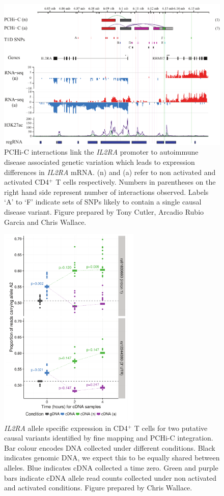 \documentclass[a4paper,11pt]{report}
\begin{document}
\begin{figure}[h]
\centering
\includegraphics[width=\textwidth]{il2ra_ase_region.pdf}
\caption{PCHi-C interactions link the \textit{IL2RA} promoter to autoimmune disease associated genetic variation which leads to expression differences in \textit{IL2RA} mRNA. (n) and (a) refer to non activated and activated CD4$^+$ T cells respectively. Numbers in parentheses on the right hand side represent number of interactions observed. Labels `A' to `F' indicate sets of SNPs likely to contain a single causal disease variant.  Figure prepared by Tony Cutler, Arcadio Rubio Garcia and Chris Wallace.}
\label{fig:il2ra_ase_reg}
\end{figure}

\begin{figure}[h]
\centering
\includegraphics[width=0.6\textwidth]{il2ra_ase_tc.pdf}
\caption{\textit{IL2RA} allele specific expression in CD4$^{+}$ T cells for two putative causal variants identified by fine mapping and PCHi-C integration. Bar colour encodes DNA collected under different conditions. Black indicates genomic DNA, we expect this to be equally shared between alleles. Blue indicates cDNA collected a time zero. Green and purple bars indicate cDNA allele read counts collected under non activated and activated conditions. Figure prepared by Chris Wallace.}
\label{fig:il2ra_ase_tc}
\end{figure}
\end{document}
